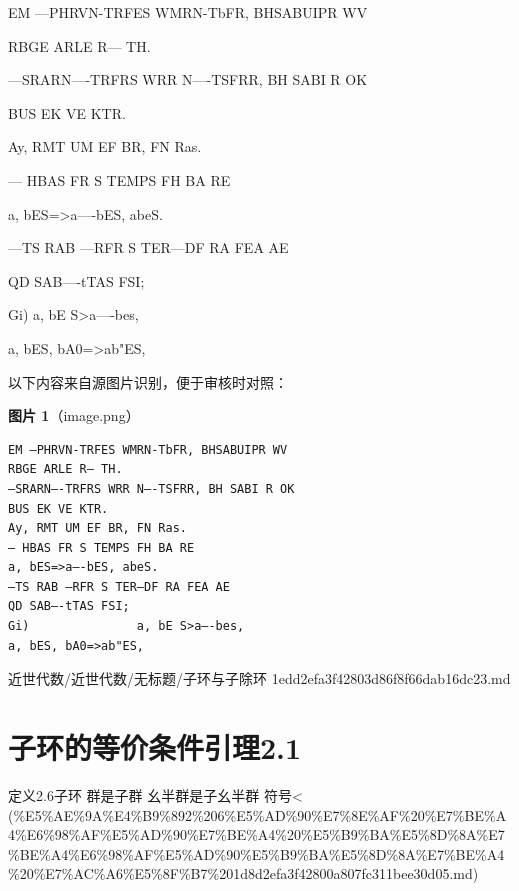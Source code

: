 \begin{note}[子环与子除环]

EM —PHRVN-TRFES WMRN-TbFR, BHSABUIPR WV

RBGE ARLE R— TH.

—SRARN—-TRFRS WRR N—-TSFRR, BH SABI R OK

BUS EK VE KTR.

Ay, RMT UM EF BR, FN Ras.

— HBAS FR S TEMPS FH BA RE

a, bES=>a—-bES, abeS.

—TS RAB —RFR S TER—DF RA FEA AE

QD SAB—-tTAS FSI;

Gi)               a, bE S>a—-bes,

a, bES, bA0=>ab"ES,

\end{note}

\begin{note}
以下内容来自源图片识别，便于审核时对照：

\textbf{图片 1}（image.png）
\begin{Verbatim}[fontsize=\small]
EM —PHRVN-TRFES WMRN-TbFR, BHSABUIPR WV
RBGE ARLE R— TH.
—SRARN—-TRFRS WRR N—-TSFRR, BH SABI R OK
BUS EK VE KTR.
Ay, RMT UM EF BR, FN Ras.
— HBAS FR S TEMPS FH BA RE
a, bES=>a—-bES, abeS.
—TS RAB —RFR S TER—DF RA FEA AE
QD SAB—-tTAS FSI;
Gi)               a, bE S>a—-bes,
a, bES, bA0=>ab"ES,
\end{Verbatim}

\end{note}

\begin{note}[来源路径]

近世代数/近世代数/无标题/子环与子除环 1edd2efa3f42803d86f8f66dab16dc23.md

\end{note}

\section*{子环的等价条件引理2.1}

\begin{note}[来源上级主题]

定义2.6子环 群是子群 幺半群是子幺半群 符号< (\%E5\%AE\%9A\%E4\%B9\%892\%206\%E5\%AD\%90\%E7\%8E\%AF\%20\%E7\%BE\%A4\%E6\%98\%AF\%E5\%AD\%90\%E7\%BE\%A4\%20\%E5\%B9\%BA\%E5\%8D\%8A\%E7\%BE\%A4\%E6\%98\%AF\%E5\%AD\%90\%E5\%B9\%BA\%E5\%8D\%8A\%E7\%BE\%A4\%20\%E7\%AC\%A6\%E5\%8F\%B7\%201d8d2efa3f42800a807fc311bee30d05.md)

\end{note}

